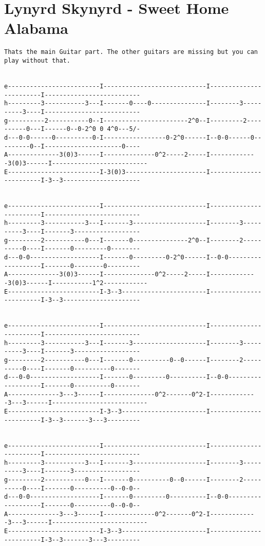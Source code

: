 \section{Lynyrd Skynyrd - Sweet Home Alabama}
\begin{verbatim}
Thats the main Guitar part. The other guitars are missing but you can play without that.


e-------------------------I----------------------------I------------------------I--------------------------
h---------3-----------3---I-------0----0---------------I--------3----------3----I--------------------------
g----------2-----------0--I-----------------------2^0--I---------2----------0---I------0--0-2^0 0 4^0---5/-
d---0-0------0----------0-I-----------------0-2^0------I--0-0------0---------0--I---------------------0----
A--------------3(0)3------I--------------0^2-----2-----I-------------3(0)3------I--------------------------
E-------------------------I-3(0)3----------------------I------------------------I-3--3---------------------


e-------------------------I----------------------------I------------------------I--------------------------
h---------3-----------3---I-------3--------------------I--------3----------3----I-------3------------------
g---------2-----------0---I-------0---------------2^0--I--------2----------0----I-------0---------0--------
d---0-0-------------------I-------0---------0-2^0------I--0-0-------------------I-------0--------0---------
A--------------3(0)3------I--------------0^2-----2-----I-------------3(0)3------I-----------1^2------------
E-------------------------I-3--3-----------------------I------------------------I-3--3---------------------


e-------------------------I----------------------------I------------------------I--------------------------
h---------3-----------3---I-------3--------------------I--------3----------3----I-------3------------------
g---------2-----------0---I-------0----------0--0------I--------2----------0----I-------0----------0-------
d---0-0-------------------I-------0---------0----------I--0-0-------------------I-------0----------0-------
A--------------3---3------I--------------0^2-------0^2-I-------------3---3------I--------------------------
E-------------------------I-3--3-----------------------I------------------------I-3--3-------3---3---------


e-------------------------I----------------------------I------------------------I--------------------------
h---------3-----------3---I-------3--------------------I--------3----------3----I-------3------------------
g---------2-----------0---I-------0----------0--0------I--------2----------0----I-------0----------0--0-0--
d---0-0-------------------I-------0---------0----------I--0-0-------------------I-------0----------0--0-0--
A--------------3---3------I--------------0^2-------0^2-I-------------3---3------I--------------------------
E-------------------------I-3--3-----------------------I------------------------I-3--3-------3---3---------



\end{verbatim}

